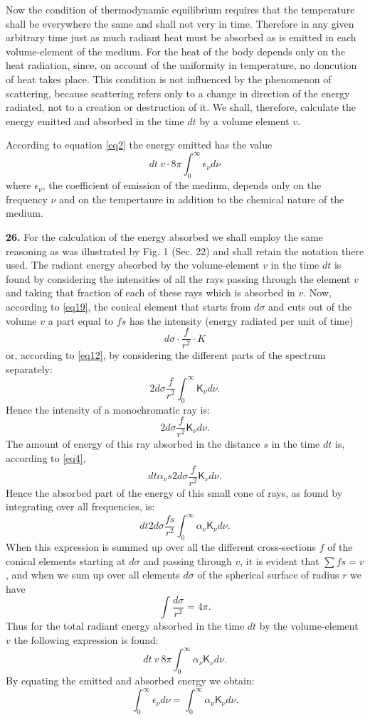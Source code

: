 \documentclass[12pt,oneside]{book}
\begin{document}
Now the condition of thermodynamic equilibrium requires that the temperature shall be everywhere the same and shall not very in time. Therefore in any given arbitrary time just as much radiant heat must be absorbed as is emitted in each volume-element of the medium. For the heat of the body depends only on the heat radiation, since, on account of the uniformity in temperature, no doncution of heat takes place. This condition is not influenced by the phenomenon of scattering, because scattering refers only to a change in direction of the energy radiated, not to a creation or destruction of it. We shall, therefore, calculate the energy emitted and absorbed in the time $dt$ by a volume element $v$. \par 

According to equation \eqref{eq2} the energy emitted has the value 
$$dt\ v\cdot 8\pi\int_0^\infty \epsilon_\nu d\nu$$
where $\epsilon_\nu$, the coefficient of emission of the medium, depends only on the frequency $\nu$ and on the tempertaure in addition to the chemical nature of the medium. \par 

\textbf{26.} For the calculation of the energy absorbed we shall employ the same reasoning as was illustrated by Fig. 1 (Sec. 22) and shall retain the notation there used. The radiant energy absorbed by the volume-element $v$ in the time $dt$ is found by considering the intensities of all the rays passing through the element $v$ and taking that fraction of each of these rays which is absorbed in $v$. Now, according to \eqref{eq19}, the conical element that starts from $d\sigma$ and cuts out of the volume $v$ a part equal to $fs$ has the intensity (energy radiated per unit of time)
$$d\sigma\cdot\frac{f}{r^2}\cdot K$$
or, according to \eqref{eq12}, by considering the different parts of the spectrum separately:
$$2d\sigma\frac{f}{r^2}\int_0^\infty \mathsf{K}_\nu d\nu.$$
Hence the intensity of a monochromatic ray is: 
$$2d\sigma\frac{f}{r^2}\mathsf{K}_\nu d\nu.$$
The amount of energy of this ray absorbed in the distance $s$ in the time $dt$ is, according to \eqref{eq4},
$$dt\alpha_\nu s2d\sigma\frac{f}{r^2}\mathsf{K}_\nu d\nu.$$
Hence the absorbed part of the energy of this small cone of rays, as found by integrating over all frequencies, is: 
$$dt2d\sigma\frac{fs}{r^2}\int_0^\infty\alpha_\nu\mathsf{K}_\nu d\nu.$$
When this expression is summed up over all the different cross-sections $f$ of the conical elements starting at $d\sigma$ and passing through $v$, it is evident that $\sum fs=v$, and when we sum up over all elements $d\sigma$ of the spherical surface of radius $r$ we have 
$$\int\frac{d\sigma}{r^2}=4\pi.$$
Thus for the total radiant energy absorbed in the time $dt$ by the volume-element $v$ the following expression is found:
\begin{equation}
    dt\ v\ 8\pi\int_0^\infty \alpha_\nu\mathsf{K}_\nu d\nu.
    \label{eq25}
\end{equation}
By equating the emitted and absorbed energy we obtain: 
\begin{equation*}
    \int_0^\infty \epsilon_\nu d\nu=\int_0^\infty \alpha_\nu\mathsf{K}_\nu d\nu.
\end{equation*} \par 
\end{document}

